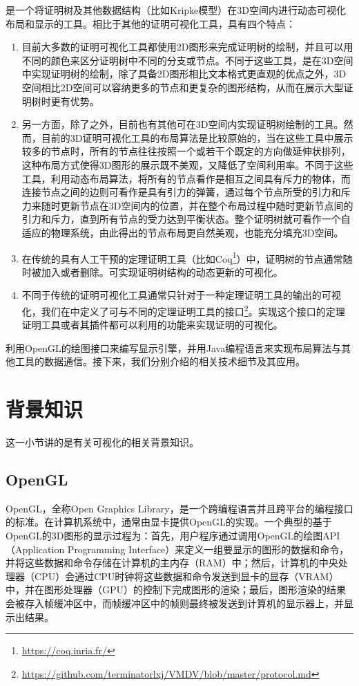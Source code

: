 是一个将证明树及其他数据结构（比如Kripke模型）在3D空间内进行动态可视化布局和显示的工具。相比于其他的证明可视化工具，具有四个特点：
\begin{enumerate}
	\item 目前大多数的证明可视化工具\cite{byrnes2009visualizing,LibalRR14,sakurai2011mikibeta,steel2005visualising}都使用2D图形来完成证明树的绘制，并且可以用不同的颜色来区分证明树中不同的分支或节点。不同于这些工具，是在3D空间中实现证明树的绘制，除了具备2D图形相比文本格式更直观的优点之外，3D空间相比2D空间可以容纳更多的节点和更复杂的图形结构，从而在展示大型证明树时更有优势。
	\item 另一方面，除了之外，目前也有其他可在3D空间内实现证明树绘制的工具\cite{Farmer200939,bajaj2003interactive}。然而，目前的3D证明可视化工具的布局算法是比较原始的，当在这些工具中展示较多的节点时，所有的节点往往按照一个或若干个既定的方向做延伸状排列，这种布局方式使得3D图形的展示既不美观，又降低了空间利用率。不同于这些工具，利用动态布局算法，将所有的节点看作是相互之间具有斥力的物体，而连接节点之间的边则可看作是具有引力的弹簧，通过每个节点所受的引力和斥力来随时更新节点在3D空间内的位置，并在整个布局过程中随时更新节点间的引力和斥力，直到所有节点的受力达到平衡状态。整个证明树就可看作一个自适应的物理系统，由此得出的节点布局更自然美观，也能充分填充3D空间。
	\item 在传统的具有人工干预的定理证明工具（比如Coq\footnote{\url{https://coq.inria.fr/}}）中，证明树的节点通常随时被加入或者删除。可实现证明树结构的动态更新的可视化。
	\item 不同于传统的证明可视化工具通常只针对于一种定理证明工具的输出的可视化，我们在中定义了可与不同的定理证明工具的接口\footnote{\url{https://github.com/terminatorlxj/VMDV/blob/master/protocol.md}}。实现这个接口的定理证明工具或者其插件都可以利用的功能来实现证明的可视化。
\end{enumerate}


利用\textsf{OpenGL}的绘图接口来编写显示引擎，并用Java编程语言来实现布局算法与其他工具的数据通信。接下来，我们分别介绍的相关技术细节及其应用。

\section{背景知识}
这一小节讲的是有关可视化的相关背景知识。
\subsection{OpenGL}\label{vmdv:opengl}
\textsf{OpenGL}，全称Open Graphics Library，是一个跨编程语言并且跨平台的编程接口的标准。在计算机系统中，通常由显卡提供\textsf{OpenGL}的实现。一个典型的基于\textsf{OpenGL}的3D图形的显示过程为：首先，用户程序通过调用\textsf{OpenGL}的绘图\textsf{API}（Application Programming Interface）来定义一组要显示的图形的数据和命令，并将这些数据和命令存储在计算机的主内存（RAM）中；然后，计算机的中央处理器（CPU）会通过CPU时钟将这些数据和命令发送到显卡的显存（VRAM）中，并在图形处理器（GPU）的控制下完成图形的渲染；最后，图形渲染的结果会被存入帧缓冲区中，而帧缓冲区中的帧则最终被发送到计算机的显示器上，并显示出结果。

